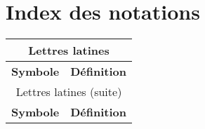 \chapter{Index des notations}\label{chap:IndexNotations}%

\begin{center}
    \begin{longtable}{p{} p{}}
        \multicolumn{2}{c}{Lettres latines}  \\\hline
        \textbf{Symbole} & \textbf{Définition} \\\hline\hline \endfirsthead
        \multicolumn{2}{c}{Lettres latines (suite)}  \\\hline
        \textbf{Symbole} & \textbf{Définition} \\\hline\hline \endhead
		

\end{longtable}
\end{center}
